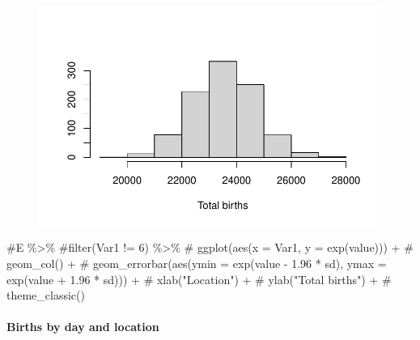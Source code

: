 \documentclass[
  letterpaper,
  DIV=11,
  numbers=noendperiod]{scrartcl}
\let\oldparagraph\paragraph
\renewcommand{\paragraph}[1]{\oldparagraph{#1}\mbox{}}
\newenvironment{Shaded}{\begin{snugshade}}{\end{snugshade}}
\newcommand{\CommentTok}[1]{\textcolor[rgb]{0.37,0.37,0.37}{#1}}
\begin{document}
\begin{figure}[H]

{\centering \includegraphics{KaleDoc_files/figure-pdf/unnamed-chunk-10-1.pdf}

}

\end{figure}

\begin{Shaded}
\begin{Highlighting}[]
\CommentTok{\#E \%\textgreater{}\% \#filter(Var1 != 6) \%\textgreater{}\%}
\CommentTok{\#  ggplot(aes(x = Var1, y = exp(value))) +}
\CommentTok{\#  geom\_col() +}
\CommentTok{\#  geom\_errorbar(aes(ymin = exp(value {-} 1.96 * sd), ymax = exp(value + 1.96 * sd))) +}
\CommentTok{\#  xlab("Location") +}
\CommentTok{\#  ylab("Total births") +}
\CommentTok{\#  theme\_classic()}
\end{Highlighting}
\end{Shaded}

\hypertarget{births-by-day-and-location}{%
\paragraph{Births by day and
location}\label{births-by-day-and-location}}
\end{document}
